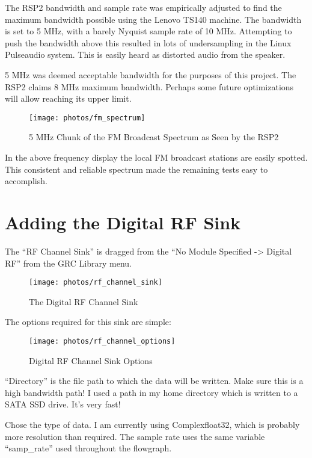 The RSP2 bandwidth and sample rate was empirically adjusted to find the maximum bandwidth possible using the Lenovo TS140 machine.  The bandwidth is set to 5 MHz, with a barely Nyquist sample rate of 10 MHz.  Attempting to push the bandwidth above this resulted in lots of undersampling in the Linux Pulseaudio system.  This is easily heard as distorted audio from the speaker.

5 MHz was deemed acceptable bandwidth for the purposes of this project.  The RSP2 claims 8 MHz maximum bandwidth.  Perhaps some future optimizations will allow reaching its upper limit.

\begin{figure}[H]
	\centering
	\texttt{[image: photos/fm\_spectrum]}
	\centering\bfseries
	\caption{5 MHz Chunk of the FM Broadcast Spectrum as Seen by the RSP2}
\end{figure}

In the above frequency display the local FM broadcast stations are easily spotted.  This consistent and reliable spectrum made the remaining tests easy to accomplish.

\section{Adding the Digital RF Sink}

The ``RF Channel Sink'' is dragged from the ``No Module Specified -> Digital RF'' from the GRC Library menu.

\begin{figure}[H]
	\centering
	\texttt{[image: photos/rf\_channel\_sink]}
	\centering\bfseries
	\caption{The Digital RF Channel Sink}
\end{figure}

The options required for this sink are simple:

\begin{figure}[H]
	\centering
	\texttt{[image: photos/rf\_channel\_options]}
	\centering\bfseries
	\caption{Digital RF Channel Sink Options}
\end{figure}

``Directory'' is the file path to which the data will be written.  Make sure this is a high bandwidth path!  I used a path in my home directory which is written to a SATA SSD drive.  It's very fast!

Chose the type of data.  I am currently using Complexfloat32, which is probably more resolution than required.  The sample rate uses the same variable ``samp\_rate'' used throughout the flowgraph.

